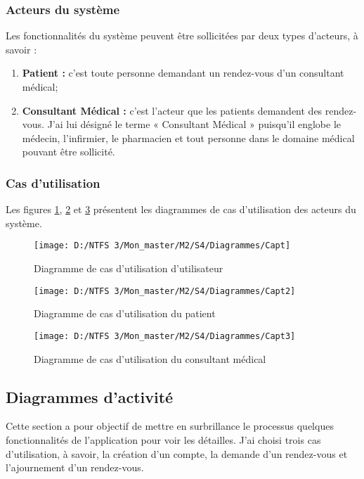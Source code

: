 \subsubsection{Acteurs du système}
Les fonctionnalités du système peuvent être sollicitées par deux types d’acteurs, à savoir :
\begin{enumerate}
	\item \textbf{Patient :} c'est toute personne demandant un rendez-vous d'un consultant médical;
	\item \textbf{Consultant Médical :} c’est l'acteur que les patients demandent des rendez-vous. J'ai lui désigné le terme « Consultant Médical » puisqu'il englobe le médecin, l'infirmier, le pharmacien et tout personne dans le domaine médical pouvant être sollicité.
\end{enumerate}

\subsubsection{Cas d'utilisation}
Les figures \ref{Figure 4.1}, \ref{Figure 4.2} et \ref{Figure 4.3} présentent les diagrammes de cas d’utilisation des acteurs du système.
\begin{figure}[h]
\texttt{[image: D:/NTFS 3/Mon\_master/M2/S4/Diagrammes/Capt]}
	\centering
	\caption{Diagramme de cas d'utilisation d'utilisateur}
	\label{Figure 4.1}
\end{figure}
\begin{figure}[h]
\texttt{[image: D:/NTFS 3/Mon\_master/M2/S4/Diagrammes/Capt2]}
	\centering
	\caption{Diagramme de cas d'utilisation du patient}
	\label{Figure 4.2}
\end{figure}
\begin{figure}[h]
\texttt{[image: D:/NTFS 3/Mon\_master/M2/S4/Diagrammes/Capt3]}
	\centering
	\caption{Diagramme de cas d'utilisation du consultant médical}
	\label{Figure 4.3}
\end{figure}

\subsection{Diagrammes d’activité}
Cette section a pour objectif de mettre en surbrillance le processus quelques fonctionnalités de l'application pour voir les détailles. J'ai choisi trois cas d’utilisation, à savoir, la création d’un compte, la demande d’un rendez-vous et l’ajournement d’un rendez-vous.

